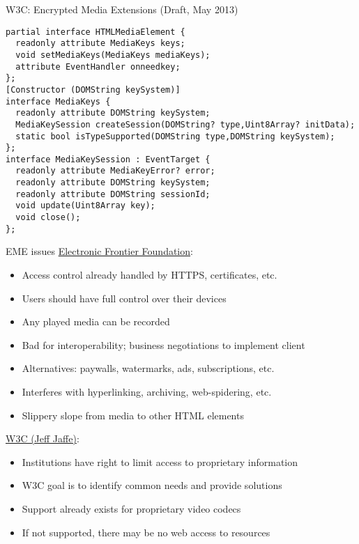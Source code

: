 \documentclass{beamer}
\begin{document}
\begin{frame}[fragile]{W3C: Encrypted Media Extensions (Draft, May 2013)}
\footnotesize
\begin{lstlisting}
partial interface HTMLMediaElement {
  readonly attribute MediaKeys keys;
  void setMediaKeys(MediaKeys mediaKeys);
  attribute EventHandler onneedkey;
};
[Constructor (DOMString keySystem)]
interface MediaKeys {
  readonly attribute DOMString keySystem;
  MediaKeySession createSession(DOMString? type,Uint8Array? initData);
  static bool isTypeSupported(DOMString type,DOMString keySystem);
};
interface MediaKeySession : EventTarget {
  readonly attribute MediaKeyError? error;
  readonly attribute DOMString keySystem;
  readonly attribute DOMString sessionId;
  void update(Uint8Array key);
  void close();
};
\end{lstlisting}
\end{frame}

\begin{frame}{EME issues}
\href{https://www.eff.org/deeplinks/2013/10/lowering-your-standards}{Electronic Frontier Foundation}:
\begin{itemize}
\item Access control already handled by HTTPS, certificates, etc.
\item Users should have full control over their devices
\item Any played media can be recorded
\item Bad for interoperability; business negotiations to implement client
\item Alternatives: paywalls, watermarks, ads, subscriptions, etc.
\item Interferes with hyperlinking, archiving, web-spidering, etc.
\item Slippery slope from media to other HTML elements
\end{itemize}
\href{http://www.w3.org/blog/2013/05/perspectives-on-encrypted-medi/}{W3C (Jeff Jaffe)}:
\begin{itemize}
\item Institutions have right to limit access to proprietary information
\item W3C goal is to identify common needs and provide solutions
\item Support already exists for proprietary video codecs
\item If not supported, there may be no web access to resources
\end{itemize}
\end{frame}
\end{document}
